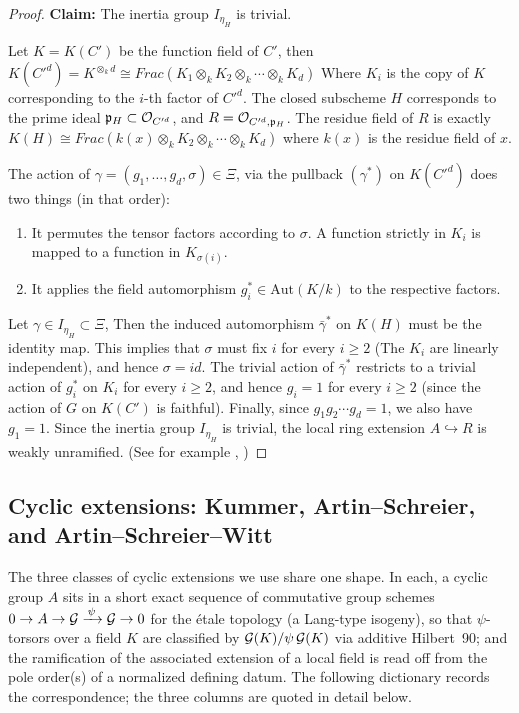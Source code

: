 \begin{proof}
\textbf{Claim: } The inertia group $I_{\eta_H}$ is trivial.

Let $K=K(C')$ be the function field of $C'$, then 
$K(C'^d) = K^{\otimes_k d} \cong Frac(K_1 \otimes_k K_2 \otimes_k \cdots \otimes_k K_d)$
Where $K_i$ is the copy of $K$ corresponding to the $i$-th factor of $C'^d$.
The closed subscheme $H$ corresponds to the prime ideal $\mathfrak{p}_H \subset \mathcal{O}_{C'^d}$, and $R=\mathcal{O}_{C'^d, \mathfrak{p}_H}$. 
The residue field of $R$ is exactly $K(H) \cong Frac(k(x) \otimes_k K_2 \otimes_k \cdots \otimes_k K_d)$ where $k(x)$ is the residue field of $x$.

The action of $\gamma = (g_1, \ldots, g_d, \sigma) \in \Xi$, via the pullback $(\gamma^*)$ on $K(C'^d)$ does two things (in that order):
\begin{enumerate}
    \item It permutes the tensor factors according to $\sigma$. A function strictly in $K_i$ is mapped to a function in $K_{\sigma(i)}$.
    \item It applies the field automorphism $g_i^* \in \mathrm{Aut}(K/k)$ to the respective factors.
\end{enumerate}
Let $\gamma \in I_{\eta_H} \subset \Xi$, Then the induced automorphism $\bar{\gamma}^*$ on $K(H)$ must be the identity map.
This implies that $\sigma$ must fix $i$ for every $i \geq 2$ (The $K_i$ are linearly independent), and hence $\sigma=id$.
The trivial action of $\bar{\gamma}^*$ restricts to a trivial action of $g_i^*$ on $K_{i}$ for every $i \geq 2$, and hence 
$g_i = 1$ for every $i \geq 2$ (since the action of $G$ on $K(C')$ is faithful).
Finally, since $g_1 g_2 \cdots g_d = 1$, we also have $g_1 = 1$.
Since the inertia group $I_{\eta_H}$ is trivial, the local ring extension $A \hookrightarrow R$ is weakly unramified.
(See for example , )

\end{proof}


\subsection{Cyclic extensions: Kummer, Artin--Schreier, and Artin--Schreier--Witt}
The three classes of cyclic extensions we use share one shape. In each, a
cyclic group $A$ sits in a short exact sequence of commutative group schemes
$0 \to A \to \mathcal{G} \xrightarrow{\,\psi\,} \mathcal{G} \to 0$ for the \'etale topology (a
Lang-type isogeny), so that $\psi$-torsors over a field $K$ are classified by
$\mathcal{G}(K)/\psi\,\mathcal{G}(K)$ via additive Hilbert~90; and the ramification of the
associated extension of a local field is read off from the pole order(s) of a
normalized defining datum. The following dictionary records the
correspondence; the three columns are quoted in detail below.

